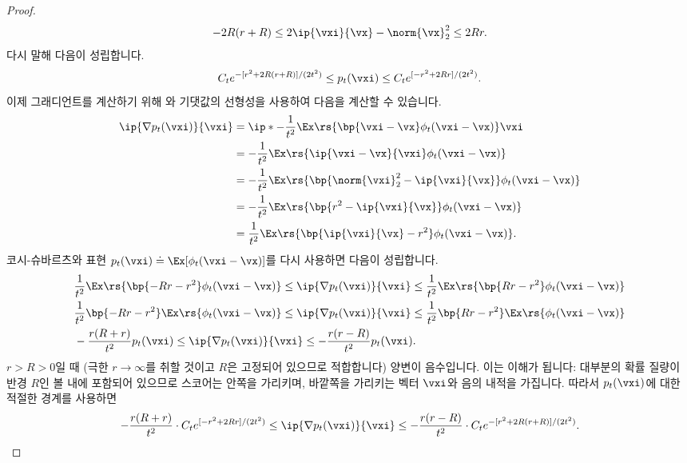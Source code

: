 \documentclass[../../book-main_ko.tex]{subfiles}
\begin{document}
\begin{proof}
\begin{equation}
        -2R(r + R) \leq 2\ip{\vxi}{\vx} - \norm{\vx}_{2}^{2} \leq 2Rr.
    \end{equation}
    다시 말해 다음이 성립합니다.
    \begin{equation}
        C_{t}e^{-[r^{2} + 2R(r + R)]/(2t^{2})} \leq p_{t}(\vxi) \leq C_{t}e^{[-r^{2} + 2Rr]/(2t^{2})}.
    \end{equation}
    이제 그래디언트를 계산하기 위해 와 기댓값의 선형성을 사용하여 다음을 계산할 수 있습니다.
    \begin{align}
        \ip{\nabla p_{t}(\vxi)}{\vxi}
        &= \ip*{-\frac{1}{t^{2}}\Ex\rs{\bp{\vxi - \vx}\phi_{t}(\vxi - \vx)}}{\vxi} \\
        &= -\frac{1}{t^{2}}\Ex\rs{\ip{\vxi - \vx}{\vxi}\phi_{t}(\vxi - \vx)} \\
        &= -\frac{1}{t^{2}}\Ex\rs{\bp{\norm{\vxi}_{2}^{2} - \ip{\vxi}{\vx}}\phi_{t}(\vxi - \vx)} \\
        &= -\frac{1}{t^{2}}\Ex\rs{\bp{r^{2} - \ip{\vxi}{\vx}}\phi_{t}(\vxi - \vx)} \\
        &= \frac{1}{t^{2}}\Ex\rs{\bp{\ip{\vxi}{\vx} - r^{2}}\phi_{t}(\vxi - \vx)}.
    \end{align}
    코시-슈바르츠와 표현 \(p_{t}(\vxi) \doteq \Ex[\phi_{t}(\vxi - \vx)]\)를 다시 사용하면 다음이 성립합니다.
    \begin{align}
        &\frac{1}{t^{2}}\Ex\rs{\bp{-Rr - r^{2}}\phi_{t}(\vxi - \vx)} \leq \ip{\nabla p_{t}(\vxi)}{\vxi} \leq \frac{1}{t^{2}}\Ex\rs{\bp{Rr - r^{2}}\phi_{t}(\vxi - \vx)} \\
        &\frac{1}{t^{2}}\bp{-Rr - r^{2}}\Ex\rs{\phi_{t}(\vxi - \vx)} \leq \ip{\nabla p_{t}(\vxi)}{\vxi} \leq \frac{1}{t^{2}}\bp{Rr - r^{2}}\Ex\rs{\phi_{t}(\vxi - \vx)} \\
        &-\frac{r(R + r)}{t^{2}}p_{t}(\vxi) \leq \ip{\nabla p_{t}(\vxi)}{\vxi} \leq -\frac{r(r - R)}{t^{2}}p_{t}(\vxi).
    \end{align}
    \(r > R > 0\)일 때 (극한 \(r \to \infty\)를 취할 것이고 \(R\)은 고정되어 있으므로 적합합니다) 양변이 음수입니다. 이는 이해가 됩니다: 대부분의 확률 질량이 반경 \(R\)인 볼 내에 포함되어 있으므로 스코어는 안쪽을 가리키며, 바깥쪽을 가리키는 벡터 \(\vxi\)와 음의 내적을 가집니다. 따라서 \(p_{t}(\vxi)\)에 대한 적절한 경계를 사용하면
    \begin{equation}
        -\frac{r(R + r)}{t^{2}}\cdot C_{t}e^{[-r^{2} + 2Rr]/(2t^{2})} \leq \ip{\nabla p_{t}(\vxi)}{\vxi} \leq -\frac{r(r - R)}{t^{2}}\cdot C_{t}e^{-[r^{2} + 2R(r + R)]/(2t^{2})}.
    \end{equation}

\end{proof}
\end{document}
